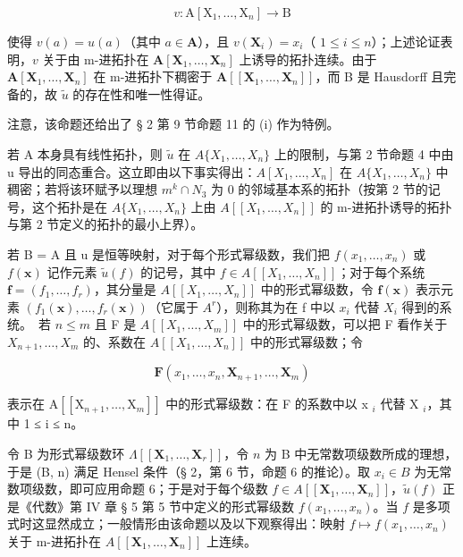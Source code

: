 \[
v \colon \mathrm{A} [ \mathrm{X} _ {1}, \dots , \mathrm{X} _ {n} ] \rightarrow \mathrm{B}
\]

使得 \(v(a) = u(a)\)（其中 \(a \in \mathbf{A}\)），且 \(v(\mathbf{X}_i) = x_i\)（ \(1 \leqslant i \leqslant n\)）；上述论证表明，\(v\) 关于由 m-进拓扑在 \(\mathbf{A}[\mathbf{X}_1, \ldots, \mathbf{X}_n]\) 上诱导的拓扑连续。由于 \(\mathbf{A}[\mathbf{X}_1, \ldots, \mathbf{X}_n]\) 在 m-进拓扑下稠密于 \(\mathbf{A}[[\mathbf{X}_1, \ldots, \mathbf{X}_n]]\)，而 B 是 Hausdorff 且完备的，故 \(\tilde{u}\) 的存在性和唯一性得证。

注意，该命题还给出了 § 2 第 9 节命题 11 的 (i) 作为特例。

若 A 本身具有线性拓扑，则 \(\tilde{u}\) 在 \(A\{X_{1},\ldots,X_{n}\}\) 上的限制，与第 2 节命题 4 中由 u 导出的同态重合。这立即由以下事实得出：\(A[X_{1},\ldots,X_{n}]\) 在 \(A\{X_{1},\ldots,X_{n}\}\) 中稠密；若将该环赋予以理想 \(m^{k}\cap N_{3}\) 为 0 的邻域基本系的拓扑（按第 2 节的记号，这个拓扑是在 \(A\{X_{1},\ldots,X_{n}\}\) 上由 \(A[[X_{1},\ldots,X_{n}]]\) 的 m-进拓扑诱导的拓扑与第 2 节定义的拓扑的最小上界）。

若 B = A 且 u 是恒等映射，对于每个形式幂级数，我们把 \(f(x_{1}, \ldots, x_{n})\) 或 \(f(\mathbf{x})\) 记作元素 \(\tilde{u}(f)\) 的记号，其中 \(f \in A[[X_{1}, \ldots, X_{n}]]\)；对于每个系统 \(\mathbf{f} = (f_{1}, \ldots, f_{r})\)，其分量是 \(A[[X_{1}, \ldots, X_{n}]]\) 中的形式幂级数，令 \(\mathbf{f}(\mathbf{x})\) 表示元素 \((f_{1}(\mathbf{x}), \ldots, f_{r}(\mathbf{x}))\)（它属于 \(A^{r}\)），则称其为在 f 中以 \(x_{i}\) 代替 \(X_{i}\) 得到的系统。~若 \(n \leqslant m\) 且 F 是 \(A[[X_{1}, \ldots, X_{m}]]\) 中的形式幂级数，可以把 F 看作关于 \(X_{n+1}, \ldots, X_{m}\) 的、系数在 \(A[[X_{1}, \ldots, X_{n}]]\) 中的形式幂级数；令

\[
\mathbf {F} (x _ {1}, \dots , x _ {n}, \mathbf {X} _ {n + 1}, \dots , \mathbf {X} _ {m})
\]

表示在 \(\mathrm{A}[[\mathrm{X}_{n+1}, \ldots, \mathrm{X}_{m}]]\) 中的形式幂级数：在 F 的系数中以 x \(_{i}\) 代替 X \(_{i}\)，其中 1 ≤ i ≤ n。

令 B 为形式幂级数环 \(\Lambda[[\mathbf{X}_1,\ldots,\mathbf{X}_r]]\)，令 \(n\) 为 B 中无常数项级数所成的理想，于是 (B, n) 满足 Hensel 条件（§ 2，第 6 节，命题 6 的推论）。取 \(x_i \in B\) 为无常数项级数，即可应用命题 6；于是对于每个级数 \(f \in A[[\mathbf{X}_1,\ldots,\mathbf{X}_n]]\)，\(\tilde{u}(f)\) 正是《代数》第 IV 章 § 5 第 5 节中定义的形式幂级数 \(f(x_1,\ldots,x_n)\)。当 \(f\) 是多项式时这显然成立；一般情形由该命题以及以下观察得出：映射 \(f \mapsto f(x_1,\ldots,x_n)\) 关于 m-进拓扑在 \(A[[\mathbf{X}_1,\ldots,\mathbf{X}_n]]\) 上连续。

